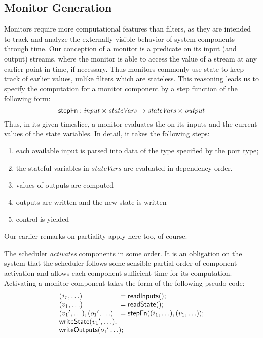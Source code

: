 
\subsection{Monitor Generation}

Monitors require more computational features than filters, as they are
intended to track and analyze the externally visible behavior of
system components through time.  Our conception of
a monitor is a predicate on its input (and output) streams, where the
monitor is able to access the value of a stream at any earlier point in time,  if necessary. Thus monitors commonly use state to keep track of earlier values, unlike filters which are stateless. This reasoning leads us to specify the  computation for a monitor component  by a step function of the following form:
\[
\mathsf{stepFn} : \mathit{input} \times \mathit{stateVars} \to \mathit{stateVars} \times \mathit{output}
\]
Thus, in its given timeslice, a monitor evaluates the  on its inputs and the current values of the state variables. In detail, it takes the following steps:

\begin{enumerate}

\item each available input is parsed into data of the type specified
by the port type;

\item the stateful variables in $\mathit{stateVars}$  are evaluated in dependency order.

\item values of outputs are computed

\item outputs are written and the new state is written

\item control is yielded
\end{enumerate}

Our earlier remarks on partiality apply here too, of course.


The scheduler \emph{activates} components in some order.  It is an obligation on the system that the scheduler follows some sensible partial order of component activation and allows each component sufficient time for its computation.
 Activating a monitor component takes the form of the following pseudo-code: 
\[
\begin{array}{ll}
 \mathit{(i_1,\ldots)} & = \konst{readInputs}(); \\
 (v_1,\ldots) & = \konst{readState}() ; \\
 ({v_1}',\ldots), ({o_1}',\ldots) & = \konst{stepFn} ((i_1,\ldots),(v_1,\ldots)) ; \\
 \multicolumn{2}{l}{\konst{writeState}({v_1}',\ldots);} \\
 \multicolumn{2}{l}{\konst{writeOutputs}({o_1}'\ldots);} \\
\end{array}
\]

